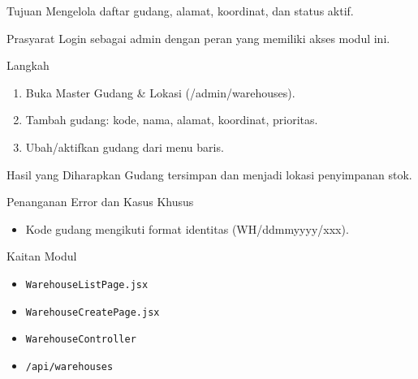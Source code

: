 
\begin{flowsection}{Tujuan}
Mengelola daftar gudang, alamat, koordinat, dan status aktif.
\end{flowsection}

\begin{flowsection}{Prasyarat}
Login sebagai admin dengan peran yang memiliki akses modul ini.
\end{flowsection}

\begin{flowsection}{Langkah}
\begin{enumerate}
  \item Buka Master Gudang \&  Lokasi (/admin/warehouses).
  \item Tambah gudang: kode, nama, alamat, koordinat, prioritas.
  \item Ubah/aktifkan gudang dari menu baris.
\end{enumerate}
\end{flowsection}


\begin{flowsection}{Hasil yang Diharapkan}
Gudang tersimpan dan menjadi lokasi penyimpanan stok.
\end{flowsection}

\begin{flowsection}{Penanganan Error dan Kasus Khusus}
\begin{itemize}
  \item Kode gudang mengikuti format identitas (WH/ddmmyyyy/xxx).
\end{itemize}
\end{flowsection}

\begin{flowsection}{Kaitan Modul}
\begin{itemize}
  \item \texttt{WarehouseListPage.jsx}
  \item \texttt{WarehouseCreatePage.jsx}
  \item \texttt{WarehouseController}
  \item \texttt{/api/warehouses}
\end{itemize}
\end{flowsection}

